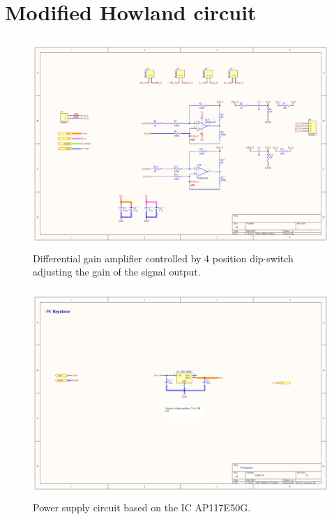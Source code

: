 \section*{Modified Howland circuit}
\label{Appendix: MHC}
\begin{figure}[!htpb]
	\centering
	\includegraphics[width=0.9\paperwidth,keepaspectratio,angle=90]{MHC}
	\caption[Schematic of the differential gain amplifier circuit]{Differential gain amplifier controlled by 4 position dip-switch adjusting the gain of the signal output.}
	\label{fig:MHC}
\end{figure}

\begin{landscape}
	\begin{figure}[!htpb]
		\centering
		\includegraphics[width=\paperwidth,keepaspectratio]{MHC_PS_5}
		\caption[Positive power supply (\SI{5}{\volt}) for the modified Howland circuit]{Power supply circuit based on the IC AP117E50G.}
		\label{fig:MHC PS 5}
	\end{figure}
\end{landscape}

